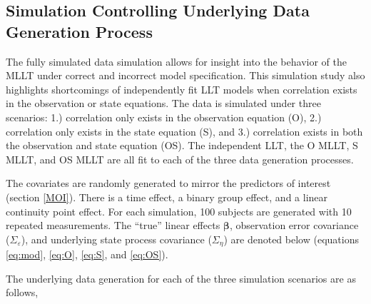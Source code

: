 \documentclass[
]{article}
\author{}
\date{\vspace{-2.5em}}
\begin{document}
\hypertarget{simulation-controlling-underlying-data-generation-process}{%
\subsection{Simulation Controlling Underlying Data Generation Process}\label{simulation-controlling-underlying-data-generation-process}}

The fully simulated data simulation allows for insight into the behavior of the MLLT under correct and incorrect model specification. This simulation study also highlights shortcomings of independently fit LLT models when correlation exists in the observation or state equations. The data is simulated under three scenarios: 1.) correlation only exists in the observation equation (O), 2.) correlation only exists in the state equation (S), and 3.) correlation exists in both the observation and state equation (OS). The independent LLT, the O MLLT, S MLLT, and OS MLLT are all fit to each of the three data generation processes.

The covariates are randomly generated to mirror the predictors of interest (section \ref{MOI}). There is a time effect, a binary group effect, and a linear continuity point effect. For each simulation, 100 subjects are generated with 10 repeated measurements. The ``true'' linear effects \(\boldsymbol{\beta}\), observation error covariance (\(\Sigma_\varepsilon\)), and underlying state process covariance (\(\Sigma_\eta\)) are denoted below (equations \ref{eq:mod}, \ref{eq:O}, \ref{eq:S}, and \ref{eq:OS}).

The underlying data generation for each of the three simulation scenarios are as follows,
\end{document}
